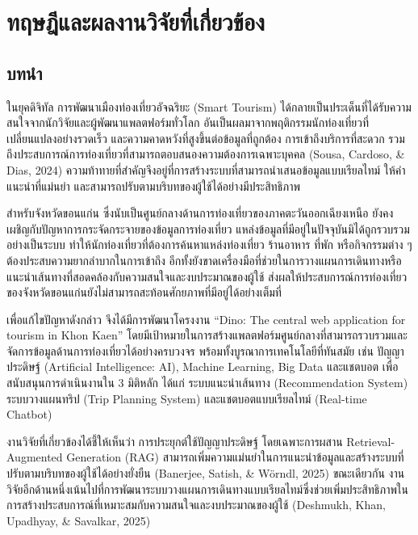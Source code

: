 \section{ทฤษฎีและผลงานวิจัยที่เกี่ยวข้อง}

\subsection{บทนำ}

ในยุคดิจิทัล การพัฒนาเมืองท่องเที่ยวอัจฉริยะ (Smart Tourism) ได้กลายเป็นประเด็นที่ได้รับความสนใจจากนักวิจัยและผู้พัฒนาแพลตฟอร์มทั่วโลก อันเป็นผลมาจากพฤติกรรมนักท่องเที่ยวที่เปลี่ยนแปลงอย่างรวดเร็ว และความคาดหวังที่สูงขึ้นต่อข้อมูลที่ถูกต้อง การเข้าถึงบริการที่สะดวก รวมถึงประสบการณ์การท่องเที่ยวที่สามารถตอบสนองความต้องการเฉพาะบุคคล (Sousa, Cardoso, \& Dias, 2024) ความท้าทายที่สำคัญจึงอยู่ที่การสร้างระบบที่สามารถนำเสนอข้อมูลแบบเรียลไทม์ ให้คำแนะนำที่แม่นยำ และสามารถปรับตามบริบทของผู้ใช้ได้อย่างมีประสิทธิภาพ

สำหรับจังหวัดขอนแก่น ซึ่งนับเป็นศูนย์กลางด้านการท่องเที่ยวของภาคตะวันออกเฉียงเหนือ ยังคงเผชิญกับปัญหาการกระจัดกระจายของข้อมูลการท่องเที่ยว แหล่งข้อมูลที่มีอยู่ในปัจจุบันมิได้ถูกรวบรวมอย่างเป็นระบบ ทำให้นักท่องเที่ยวที่ต้องการค้นหาแหล่งท่องเที่ยว ร้านอาหาร ที่พัก หรือกิจกรรมต่าง ๆ ต้องประสบความยากลำบากในการเข้าถึง อีกทั้งยังขาดเครื่องมือที่ช่วยในการวางแผนการเดินทางหรือแนะนำเส้นทางที่สอดคล้องกับความสนใจและงบประมาณของผู้ใช้ ส่งผลให้ประสบการณ์การท่องเที่ยวของจังหวัดขอนแก่นยังไม่สามารถสะท้อนศักยภาพที่มีอยู่ได้อย่างเต็มที่

เพื่อแก้ไขปัญหาดังกล่าว จึงได้มีการพัฒนาโครงงาน ``Dino: The central web application for tourism in Khon Kaen'' โดยมีเป้าหมายในการสร้างแพลตฟอร์มศูนย์กลางที่สามารถรวบรวมและจัดการข้อมูลด้านการท่องเที่ยวได้อย่างครบวงจร พร้อมทั้งบูรณาการเทคโนโลยีที่ทันสมัย เช่น ปัญญาประดิษฐ์ (Artificial Intelligence: AI), Machine Learning, Big Data และแชตบอต เพื่อสนับสนุนการดำเนินงานใน 3 มิติหลัก ได้แก่ ระบบแนะนำเส้นทาง (Recommendation System) ระบบวางแผนทริป (Trip Planning System) และแชตบอตแบบเรียลไทม์ (Real-time Chatbot)

งานวิจัยที่เกี่ยวข้องได้ชี้ให้เห็นว่า การประยุกต์ใช้ปัญญาประดิษฐ์ โดยเฉพาะการผสาน Retrieval-Augmented Generation (RAG) สามารถเพิ่มความแม่นยำในการแนะนำข้อมูลและสร้างระบบที่ปรับตามบริบทของผู้ใช้ได้อย่างยั่งยืน (Banerjee, Satish, \& Wörndl, 2025) ขณะเดียวกัน งานวิจัยอีกด้านหนึ่งเน้นไปที่การพัฒนาระบบวางแผนการเดินทางแบบเรียลไทม์ซึ่งช่วยเพิ่มประสิทธิภาพในการสร้างประสบการณ์ที่เหมาะสมกับความสนใจและงบประมาณของผู้ใช้ (Deshmukh, Khan, Upadhyay, \& Savalkar, 2025)

